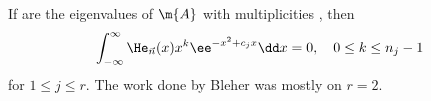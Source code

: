 If  are the eigenvalues of $\m{A}$ with multiplicities , then
\begin{equation}
	\int_{-\infty}^{\infty} \He_{\vec{n}}(x) x^k \ee^{-x^2+ c_j x} \dd x = 0, \quad 0 \leq k \leq n_j - 1
\end{equation}
for $1 \leq j \leq r$. The work done by Bleher was mostly on $r = 2$.